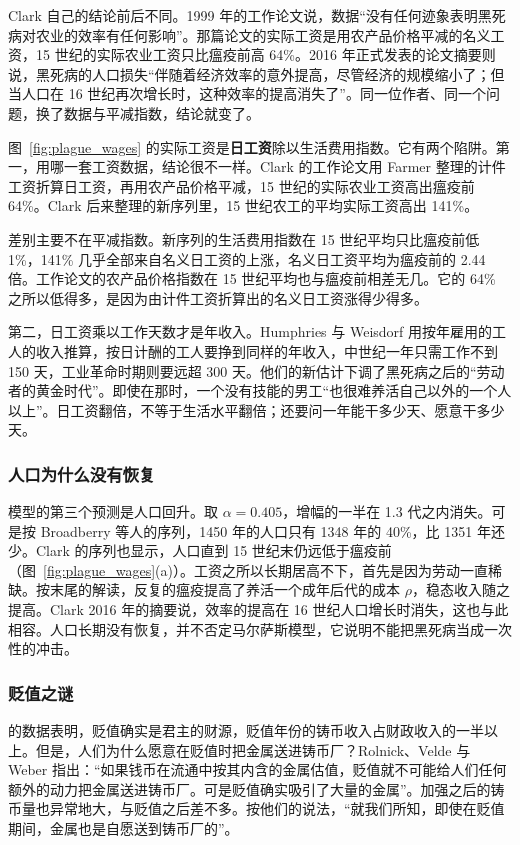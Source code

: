 Clark 自己的结论前后不同。1999 年的工作论文说，数据“没有任何迹象表明黑死病对农业的效率有任何影响”\cite{clark1999wp}。那篇论文的实际工资是用农产品价格平减的名义工资，15 世纪的实际农业工资只比瘟疫前高 64\%。2016 年正式发表的论文摘要则说，黑死病的人口损失“伴随着经济效率的意外提高，尽管经济的规模缩小了；但当人口在 16 世纪再次增长时，这种效率的提高消失了”\cite{clark2016}。同一位作者、同一个问题，换了数据与平减指数，结论就变了。

\begin{pitfall}[日工资不是生活水平]
图~\ref{fig:plague_wages} 的实际工资是\textbf{日工资}除以生活费用指数。它有两个陷阱。第一，用哪一套工资数据，结论很不一样。Clark 的工作论文用 Farmer 整理的计件工资折算日工资，再用农产品价格平减，15 世纪的实际农业工资高出瘟疫前 64\%\cite{clark1999wp}。Clark 后来整理的新序列里，15 世纪农工的平均实际工资高出 141\%。

差别主要不在平减指数。新序列的生活费用指数在 15 世纪平均只比瘟疫前低 1\%，141\% 几乎全部来自名义日工资的上涨，名义日工资平均为瘟疫前的 2.44 倍。工作论文的农产品价格指数在 15 世纪平均也与瘟疫前相差无几。它的 64\% 之所以低得多，是因为由计件工资折算出的名义日工资涨得少得多\cite{clark1999wp}。

第二，日工资乘以工作天数才是年收入。Humphries 与 Weisdorf 用按年雇用的工人的收入推算，按日计酬的工人要挣到同样的年收入，中世纪一年只需工作不到 150 天，工业革命时期则要远超 300 天\cite{hw2019}。他们的新估计下调了黑死病之后的“劳动者的黄金时代”。即使在那时，一个没有技能的男工“也很难养活自己以外的一个人以上”\cite{hw2019}。日工资翻倍，不等于生活水平翻倍；还要问一年能干多少天、愿意干多少天。
\end{pitfall}

\subsubsection{人口为什么没有恢复}
模型的第三个预测是人口回升。取 $\alpha=0.405$，增幅的一半在 1.3 代之内消失。可是按 Broadberry 等人的序列，1450 年的人口只有 1348 年的 40\%，比 1351 年还少。Clark 的序列也显示，人口直到 15 世纪末仍远低于瘟疫前（图~\ref{fig:plague_wages}(a)）。工资之所以长期居高不下，首先是因为劳动一直稀缺。按末尾的解读，反复的瘟疫提高了养活一个成年后代的成本 $\rho$，稳态收入随之提高。Clark 2016 年的摘要说，效率的提高在 16 世纪人口增长时消失，这也与此相容。人口长期没有恢复，并不否定马尔萨斯模型，它说明不能把黑死病当成一次性的冲击。

\subsubsection{贬值之谜}
的数据表明，贬值确实是君主的财源，贬值年份的铸币收入占财政收入的一半以上。但是，人们为什么愿意在贬值时把金属送进铸币厂？Rolnick、Velde 与 Weber 指出：“如果钱币在流通中按其内含的金属估值，贬值就不可能给人们任何额外的动力把金属送进铸币厂。可是贬值确实吸引了大量的金属”。加强之后的铸币量也异常地大，与贬值之后差不多\cite{rvw1996}。按他们的说法，“就我们所知，即使在贬值期间，金属也是自愿送到铸币厂的”\cite{rvw1996}。

